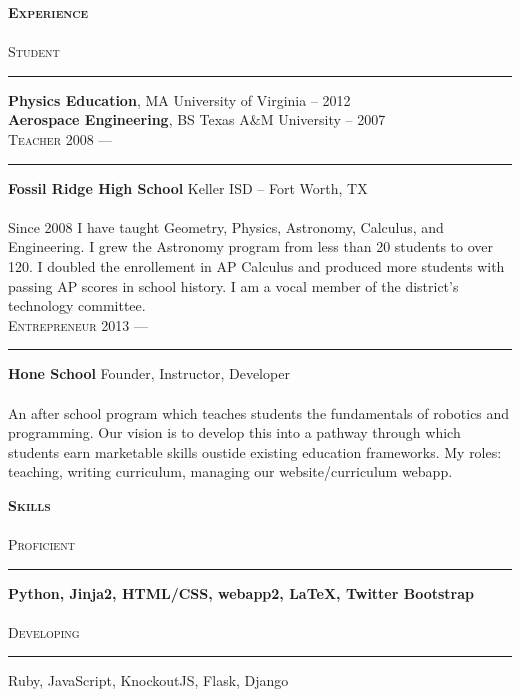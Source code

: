 \documentclass{article}
\begin{document}
\begin{multicols}{2}

\textsc{\bfseries \Large Experience} \\
\\
\textsc{\large Student }
\vspace{4pt} \hrule \vspace{4pt}

{\bfseries Physics Education}, MA \hfill University of Virginia -- 2012 \\
{\bfseries Aerospace Engineering}, BS \hfill Texas A\&M University -- 2007\\

\vspace{8pt}
\textsc{\large Teacher \hfill 2008 --- }
\vspace{4pt} \hrule \vspace{4pt}
{\bfseries Fossil Ridge High School} \hfill Keller ISD -- Fort Worth, TX \\
\\
Since 2008 I have taught Geometry, Physics, Astronomy, Calculus, and Engineering. I grew the Astronomy program from less than 20 students to over 120. I doubled the enrollement in AP Calculus and produced more students with passing AP scores in school history. I am a vocal member of the district's technology committee. \\

\vspace{8pt}
\textsc{\large Entrepreneur \hfill 2013 --- }
\vspace{4pt} \hrule \vspace{4pt}
{\bfseries Hone School} \hfill Founder, Instructor, Developer\\
\\
An after school program which teaches students the fundamentals of robotics and programming. Our vision is to develop this into a pathway through which students earn marketable skills oustide existing education frameworks. My roles: teaching, writing curriculum, managing our website/curriculum webapp. 

\columnbreak


\textsc{\bfseries \Large Skills} \\
\\
\textsc{\large Proficient }
\vspace{4pt} \hrule \vspace{4pt}
{\Large \bfseries Python, Jinja2, HTML/CSS, webapp2, \LaTeX, Twitter Bootstrap} \\
\\
\textsc{\large Developing }
\vspace{4pt} \hrule \vspace{4pt}
{\Large Ruby, JavaScript, KnockoutJS, Flask, Django} \\


\end{multicols}
\end{document}
